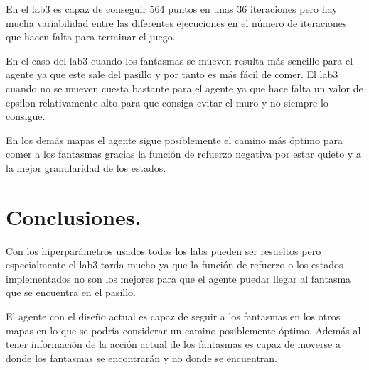 \documentclass[12pt]{article}
\begin{document}
    En el lab3 es capaz de conseguir 564 puntos en unas 36 iteraciones pero hay mucha variabilidad
    entre las diferentes ejecuciones en el número de iteraciones que hacen falta para terminar el juego.

    En el caso del lab3 cuando los fantasmas se mueven resulta más sencillo para el agente ya que este
    sale del pasillo y por tanto es más fácil de comer.
    El lab3 cuando no se mueven cuesta bastante para el agente ya que hace falta un valor de epsilon
    relativamente alto para que consiga evitar el muro y no siempre lo consigue.

    En los demás mapas el agente sigue posiblemente el camino más óptimo para comer a los fantasmas
    gracias la función de refuerzo negativa por estar quieto y a la mejor granularidad de los estados.


    \section{Conclusiones.}
    Con los hiperparámetros usados todos los labs pueden ser resueltos pero especialmente el lab3 tarda mucho ya que
    la función de refuerzo o los estados implementados no son los mejores para que el agente puedar llegar al
    fantasma que se encuentra en el pasillo.

    El agente con el diseño actual es capaz de seguir a los fantasmas en los otros mapas en lo que se podría
    considerar un camino posiblemente óptimo.
    Además al tener información de la acción actual de los fantasmas es capaz de moverse a donde los fantasmas
    se encontrarán y no donde se encuentran.
\end{document}
